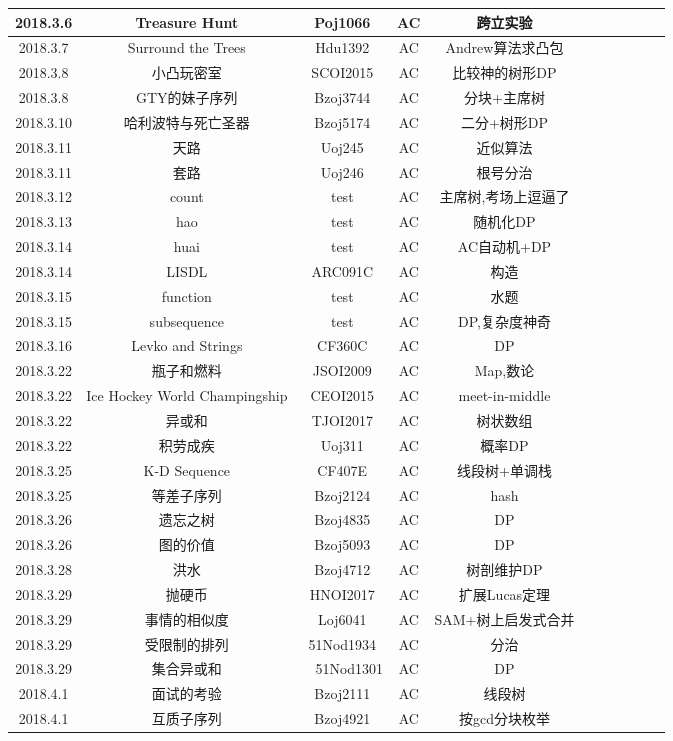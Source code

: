 \documentclass[landscape]{article}
\begin{document}
\begin{longtable}{ccccccccccc}
  \hline
  2018.3.6 & Treasure Hunt & Poj1066 & AC & 跨立实验\\
  \hline
  2018.3.7 & Surround the Trees & Hdu1392 & AC & Andrew算法求凸包\\
  \hline
  2018.3.8 & 小凸玩密室 & SCOI2015 & AC & 比较神的树形DP\\
  \hline
  2018.3.8 & GTY的妹子序列 & Bzoj3744 & AC & 分块+主席树\\
  \hline
  2018.3.10 & 哈利波特与死亡圣器 & Bzoj5174 & AC & 二分+树形DP\\
  \hline
  2018.3.11 & 天路 & Uoj245 & AC & 近似算法\\
  \hline
  2018.3.11 & 套路 & Uoj246 & AC & 根号分治\\
  \hline
  2018.3.12 & count & test & AC & 主席树,考场上逗逼了\\
  \hline
  2018.3.13 & hao & test & AC & 随机化DP\\
  \hline
  2018.3.14 & huai & test & AC & AC自动机+DP\\
  \hline
  2018.3.14 & LISDL & ARC091C & AC & 构造\\
  \hline
  2018.3.15 & function & test & AC & 水题\\
  \hline
  2018.3.15 & subsequence & test & AC & DP,复杂度神奇\\
  \hline
  2018.3.16 & Levko and Strings & CF360C & AC & DP\\
  \hline
  2018.3.22 & 瓶子和燃料 & JSOI2009 & AC & Map,数论\\
  \hline
  2018.3.22 & Ice Hockey World Champingship & CEOI2015 & AC & meet-in-middle\\
  \hline
  2018.3.22 & 异或和 & TJOI2017 & AC & 树状数组\\
  \hline
  2018.3.22 & 积劳成疾 & Uoj311 & AC & 概率DP\\
  \hline
  2018.3.25 & K-D Sequence & CF407E & AC & 线段树+单调栈\\
  \hline
  2018.3.25 & 等差子序列 & Bzoj2124 & AC & hash\\
  \hline
  2018.3.26 & 遗忘之树 & Bzoj4835 & AC & DP\\
  \hline
  2018.3.26 & 图的价值 & Bzoj5093 & AC & DP\\
  \hline
  2018.3.28 & 洪水 & Bzoj4712 & AC & 树剖维护DP\\
  \hline
  2018.3.29 & 抛硬币 & HNOI2017 & AC & 扩展Lucas定理\\
  \hline
  2018.3.29 & 事情的相似度 & Loj6041 & AC & SAM+树上启发式合并\\
  \hline
  2018.3.29 & 受限制的排列 & 51Nod1934 & AC & 分治\\
  \hline
  2018.3.29 & 集合异或和 &　51Nod1301 & AC & DP\\
  \hline
  2018.4.1 & 面试的考验 & Bzoj2111 & AC & 线段树\\
  \hline
  2018.4.1 & 互质子序列 & Bzoj4921 & AC & 按gcd分块枚举\\
  \hline
  
\end{longtable}
\end{document}
